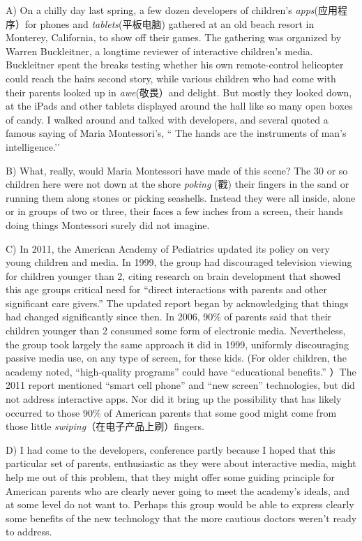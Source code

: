 \documentclass[UTF8,11pt]{ctexart}
\begin{document}
A) On a chilly day last spring, a few dozen developers of children’s\textit{ apps}(应用程序）for phones and\textit{ tablets}(平板电脑) gathered at an old beach resort in Monterey, California, to show off their games. The gathering was organized by Warren Buckleitner, a longtime reviewer of interactive children’s media. Buckleitner spent the breaks testing whether his own remote-control helicopter could reach the hairs second story, while various children who had come with their parents looked up in\textit{ awe}(敬畏）and delight. But mostly they looked down, at the iPads and other tablets displayed around the hall like so many open boxes of candy. I walked around and talked with developers, and several quoted a famous saying of Maria Montessori’s, “ The hands are the instruments of man’s intelligence.’’


B) What, really, would Maria Montessori have made of this scene? The 30 or so children here were not down at the shore \textit{poking} (戳) their fingers in the sand or running them along stones or picking seashells. Instead they were all inside, alone or in groups of two or three, their faces a few inches from a screen, their hands doing things Montessori surely did not imagine.


C) In 2011, the American Academy of Pediatrics updated its policy on very young children and media. In 1999, the group had discouraged television viewing for children younger than 2, citing research on brain development that showed this age groups critical need for “direct interactions with parents and other significant care givers.” The updated report began by acknowledging that things had changed significantly since then. In 2006, 90\% of parents said that their children younger than 2 consumed some form of electronic media. Nevertheless, the group took largely the same approach it did in 1999, uniformly discouraging passive media use, on any type of screen, for these kids. (For older children, the academy noted, “high-quality programs” could have “educational benefits.” ）The 2011 report mentioned “smart cell phone” and “new screen” technologies, but did not address interactive apps. Nor did it bring up the possibility that has likely occurred to those 90\% of American parents that some good might come from those little\textit{ swiping}（在电子产品上刷）fingers.


D) I had come to the developers, conference partly because I hoped that this particular set of parents, enthusiastic as they were about interactive media, might help me out of this problem, that they might offer some guiding principle for American parents who are clearly never going to meet the academy’s ideals, and at some level do not want to. Perhaps this group would be able to express clearly some benefits of the new technology that the more cautious doctors weren’t ready to address.
\end{document}
